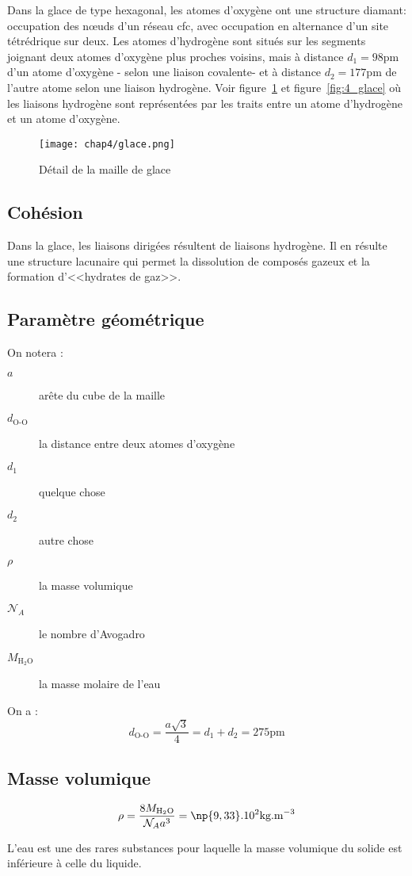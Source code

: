 Dans la glace de type hexagonal, les atomes d’oxygène
ont une structure diamant: occupation des nœuds d’un
réseau cfc, avec occupation en alternance d’un
site tétrédrique sur deux.
Les atomes d’hydrogène sont situés sur les segments
joignant deux atomes d’oxygène plus proches voisins,
mais à distance $d_1=98$pm d’un atome d’oxygène \-- selon
une liaison covalente\-- et à distance $d_2= 177$pm
de l’autre atome selon une liaison hydrogène.
Voir figure~\ref{fig:4_tétraèdre_glace} et
figure~\ref{fig:4_glace} où les liaisons hydrogène sont
représentées par les traits entre un atome d'hydrogène
et un atome d'oxygène.
\begin{figure}
    \centering
    \texttt{[image: chap4/glace.png]}
    \caption{Détail de la maille de glace}
    \label{fig:4_tétraèdre_glace}
\end{figure}

\subsection{Cohésion}
Dans la glace, les liaisons dirigées résultent de liaisons
hydrogène. Il en résulte une structure lacunaire qui permet
la dissolution de composés gazeux et la formation
d’<<hydrates de gaz>>.

\subsection{Paramètre géométrique}
On notera :
\begin{description}
    \item[$a$] arête du cube de la maille
    \item[$d_\text{O-O}$] la distance entre deux atomes
        d'oxygène
    \item[$d_1$] quelque chose
    \item[$d_2$] autre chose
    \item[$\rho$] la masse volumique
    \item[$\mathcal{N}_A$] le nombre d'Avogadro
    \item[$M_{\text{H}_2\text{O}}$] la masse molaire de
        l'eau
\end{description}
On a :
\begin{equation}
    d_\text{O-O} = \frac{a\sqrt{3}}{4} = d_1 + d_2
    = 275\text{pm}
\end{equation}

\subsection{Masse volumique}
\begin{equation}
    \rho = \frac{8M_{\text{H}_2\text{O}}}{\mathcal{N}_A
        a^3} = \np{9,33}.10^2\text{kg.m}^{-3}
\end{equation}
\begin{rem}
    L'eau est une des rares substances pour laquelle la
    masse volumique du solide est inférieure à celle du
    liquide.
\end{rem}


